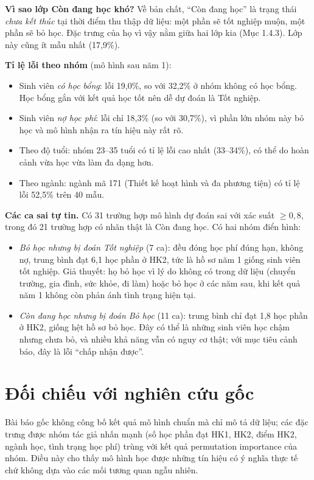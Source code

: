 \documentclass[12pt,a4paper,oneside]{report}
\begin{document}
\textbf{Vì sao lớp Còn đang học khó?} Về bản chất, ``Còn đang học'' là trạng thái \emph{chưa kết thúc} tại thời điểm thu thập dữ liệu:
một phần sẽ tốt nghiệp muộn, một phần sẽ bỏ học. Đặc trưng của họ vì vậy nằm giữa hai lớp kia (Mục 1.4.3). Lớp này cũng
ít mẫu nhất (17,9\%).

\textbf{Tỉ lệ lỗi theo nhóm} (mô hình sau năm 1):
\begin{itemize}
  \item Sinh viên \emph{có học bổng}: lỗi 19,0\%, so với 32,2\% ở nhóm không có học bổng. Học bổng gắn với kết quả học tốt nên dễ dự đoán là Tốt nghiệp.
  \item Sinh viên \emph{nợ học phí}: lỗi chỉ 18,3\% (so với 30,7\%), vì phần lớn nhóm này bỏ học và mô hình nhận ra tín hiệu này rất rõ.
  \item Theo độ tuổi: nhóm 23--35 tuổi có tỉ lệ lỗi cao nhất (33--34\%), có thể do hoàn cảnh vừa học vừa làm đa dạng hơn.
  \item Theo ngành: ngành mã 171 (Thiết kế hoạt hình và đa phương tiện) có tỉ lệ lỗi 52,5\% trên 40 mẫu.
\end{itemize}

\textbf{Các ca sai tự tin.} Có 31 trường hợp mô hình dự đoán sai với xác suất $\ge 0{,}8$, trong đó 21 trường hợp có nhãn thật là
Còn đang học. Có hai nhóm điển hình:
\begin{itemize}
  \item \emph{Bỏ học nhưng bị đoán Tốt nghiệp} (7 ca): đều đóng học phí đúng hạn, không nợ, trung bình đạt 6,1 học phần ở HK2,
        tức là hồ sơ năm 1 giống sinh viên tốt nghiệp. Giả thuyết: họ bỏ học vì lý do không có trong dữ liệu (chuyển trường,
        gia đình, sức khỏe, đi làm) hoặc bỏ học ở các năm sau, khi kết quả năm 1 không còn phản ánh tình trạng hiện tại.
  \item \emph{Còn đang học nhưng bị đoán Bỏ học} (11 ca): trung bình chỉ đạt 1,8 học phần ở HK2, giống hệt hồ sơ bỏ học. Đây có thể là
        những sinh viên học chậm nhưng chưa bỏ, và nhiều khả năng vẫn có nguy cơ thật; với mục tiêu cảnh báo, đây là lỗi ``chấp nhận được''.
\end{itemize}

\section{Đối chiếu với nghiên cứu gốc}
Bài báo gốc \cite{realinho2022} không công bố kết quả mô hình chuẩn mà chỉ mô tả dữ liệu; các đặc trưng được nhóm tác giả nhấn
mạnh (số học phần đạt HK1, HK2, điểm HK2, ngành học, tình trạng học phí) trùng với kết quả permutation importance của nhóm.
Điều này cho thấy mô hình học được những tín hiệu có ý nghĩa thực tế chứ không dựa vào các mối tương quan ngẫu nhiên.
\end{document}
